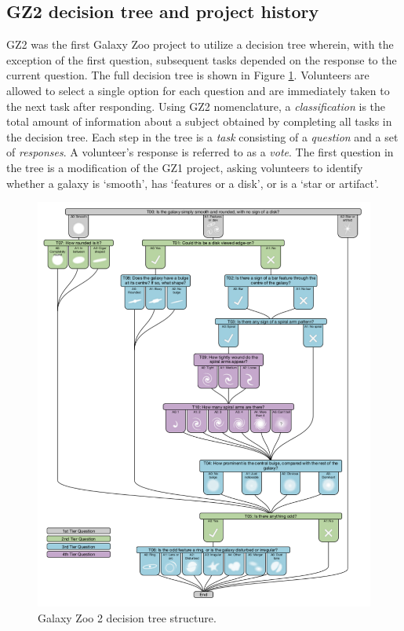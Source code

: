 \subsection{GZ2 decision tree and project history}
GZ2 was the first Galaxy Zoo project to utilize a decision tree wherein, with the exception of the first question, subsequent tasks depended on the response to the current question. The full decision tree is shown in Figure \ref{fig: gz2 decision tree}. Volunteers are allowed to select a single option for each question and are immediately taken to the next task after responding.  Using GZ2 nomenclature, a \textit{classification} is the total amount of information about a subject obtained by completing all tasks in the decision tree. Each step in the tree is a \textit{task} consisting of a \textit{question} and a set of \textit{responses}. A volunteer's response is referred to as a \textit{vote}. The first question in the tree is a modification of the GZ1 project, asking volunteers to identify whether a galaxy is `smooth', has `features or a disk', or is a `star or artifact'. 

\begin{figure}[h!]
\includegraphics[width=\textwidth]{Figures/gz2_tree.pdf}
\caption[Galaxy Zoo 2 decision tree]{Galaxy Zoo 2 decision tree structure.}
\label{fig: gz2 decision tree}
\end{figure}

